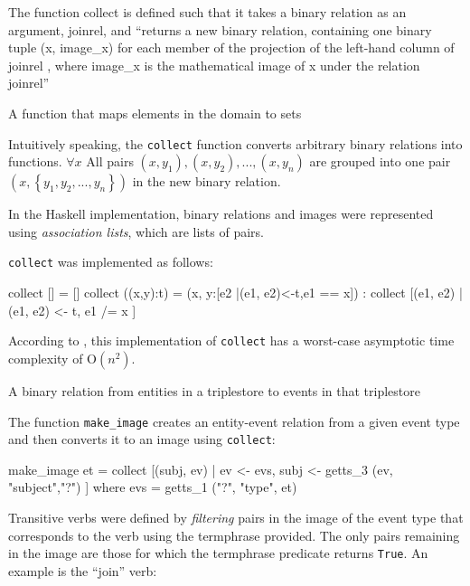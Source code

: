\documentclass[../main.tex]{subfiles}
\begin{document}
\begin{definition}
The function collect is defined such that it takes a binary relation as an
argument, joinrel, and ``returns a new binary relation, containing one binary tuple
(x, image\_x) for each member of the projection of the left-hand column of joinrel
, where image\_x is the mathematical image of x under the relation joinrel'' \cite{frost2014denotational}
\end{definition}

\begin{definition}
  A function that maps elements in the domain to sets
\end{definition}

Intuitively speaking, the \texttt{collect} function converts arbitrary binary
relations into functions.  $\forall x$ All pairs $(x, y_1), (x, y_2), ..., (x,
y_n)$ are grouped into one pair $(x, \left\{y_1, y_2, ..., y_n\right\})$ in the new binary
relation.

In the Haskell implementation, binary relations and images were represented using {\em association
lists}, which are lists of pairs\cite{frost2014denotational}.

\texttt{collect} was implemented as follows:

\begin{code}
	collect [] = []
	collect ((x,y):t) = (x, y:[e2 |(e1, e2)<-t,e1 == x])
		: collect [(e1, e2) | (e1, e2) <- t, e1 /= x ]
\end{code}

According to \cite{agboola2015extensible}, this implementation of \texttt{collect} has a worst-case asymptotic time complexity of
O$(n^2)$.

\begin{definition}
  A binary relation from entities in a triplestore to events in that triplestore
\end{definition}

The function \texttt{make\_image} creates an entity-event relation from a given event type and then converts it to an image using \texttt{collect}:

\begin{code}
  make_image et = collect
    [(subj, ev) | ev <- evs, subj <- getts_3 (ev, "subject","?") ]
	  where evs = getts_1 ("?", "type",  et)
\end{code}

Transitive verbs were defined by {\em filtering} pairs in the image of the event
type that corresponds to the verb using the termphrase provided.  The only pairs remaining in the image are those
for which the termphrase predicate returns \texttt{True}.  An example is the
``join'' verb:
\end{document}
